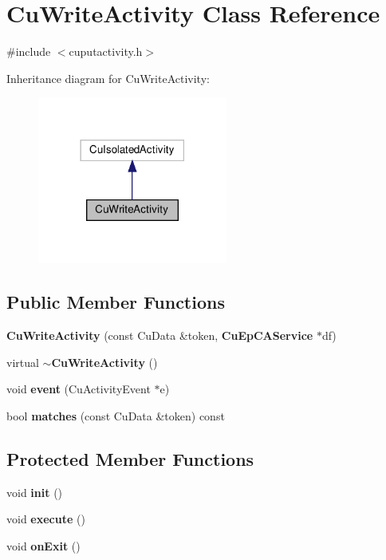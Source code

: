 \section{Cu\+Write\+Activity Class Reference}
\label{classCuWriteActivity}


{\ttfamily \#include $<$cuputactivity.\+h$>$}



Inheritance diagram for Cu\+Write\+Activity\+:\nopagebreak
\begin{figure}[H]
\begin{center}
\leavevmode
\includegraphics[width=177pt]{classCuWriteActivity__inherit__graph}
\end{center}
\end{figure}
\subsection*{Public Member Functions}
\begin{DoxyCompactItemize}
\item 
\textbf{ Cu\+Write\+Activity} (const Cu\+Data \&token, \textbf{ Cu\+Ep\+C\+A\+Service} $\ast$df)
\item 
virtual \textbf{ $\sim$\+Cu\+Write\+Activity} ()
\item 
void \textbf{ event} (Cu\+Activity\+Event $\ast$e)
\item 
bool \textbf{ matches} (const Cu\+Data \&token) const
\end{DoxyCompactItemize}
\subsection*{Protected Member Functions}
\begin{DoxyCompactItemize}
\item 
void \textbf{ init} ()
\item 
void \textbf{ execute} ()
\item 
void \textbf{ on\+Exit} ()
\end{DoxyCompactItemize}


